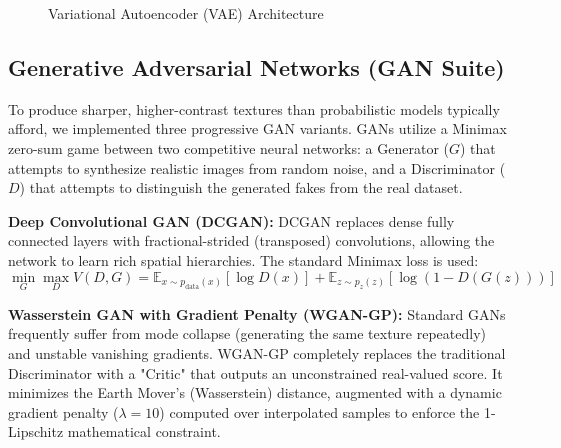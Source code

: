 \documentclass[12pt,a4paper]{article}
\begin{document}
\begin{figure}[H]
\centering
{}
\caption{Variational Autoencoder (VAE) Architecture}
\end{figure}

\subsection{Generative Adversarial Networks (GAN Suite)}
To produce sharper, higher-contrast textures than probabilistic models typically afford, we implemented three progressive GAN variants. GANs utilize a Minimax zero-sum game between two competitive neural networks: a Generator ($G$) that attempts to synthesize realistic images from random noise, and a Discriminator ($D$) that attempts to distinguish the generated fakes from the real dataset.

\textbf{Deep Convolutional GAN (DCGAN):}
DCGAN replaces dense fully connected layers with fractional-strided (transposed) convolutions, allowing the network to learn rich spatial hierarchies. The standard Minimax loss is used:
\begin{equation}
    \min_G \max_D V(D, G) = \mathbb{E}_{x \sim p_{\text{data}}(x)}[\log D(x)] + \mathbb{E}_{z \sim p_z(z)}[\log(1 - D(G(z)))]
\end{equation}

\textbf{Wasserstein GAN with Gradient Penalty (WGAN-GP):}
Standard GANs frequently suffer from mode collapse (generating the same texture repeatedly) and unstable vanishing gradients. WGAN-GP completely replaces the traditional Discriminator with a "Critic" that outputs an unconstrained real-valued score. It minimizes the Earth Mover's (Wasserstein) distance, augmented with a dynamic gradient penalty ($\lambda = 10$) computed over interpolated samples to enforce the 1-Lipschitz mathematical constraint.
\end{document}
